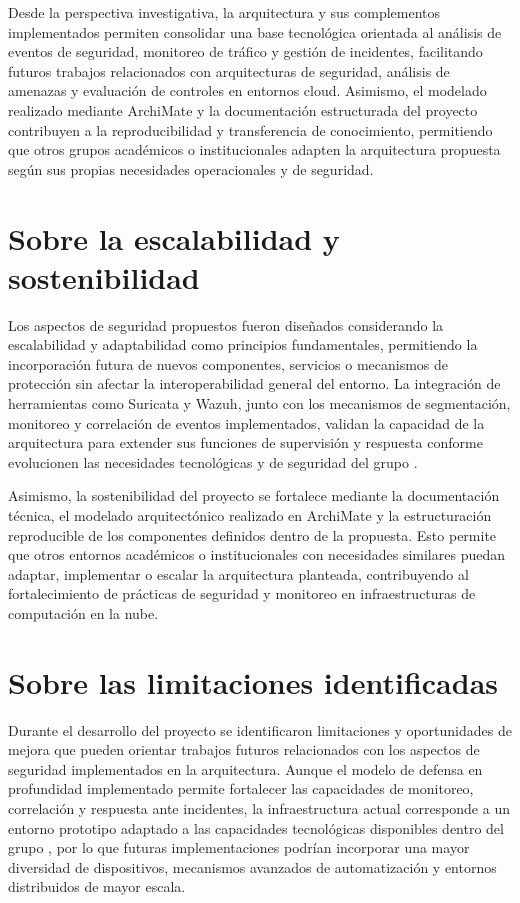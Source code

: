 Desde la perspectiva investigativa, la arquitectura y sus complementos implementados permiten consolidar una base tecnológica orientada al 
análisis de eventos de seguridad, monitoreo de tráfico y gestión de incidentes, facilitando futuros trabajos relacionados con arquitecturas 
de seguridad, análisis de amenazas y evaluación de controles en entornos cloud. Asimismo, el modelado realizado mediante ArchiMate y la 
documentación estructurada del proyecto contribuyen a la reproducibilidad y transferencia de conocimiento, permitiendo que otros grupos 
académicos o institucionales adapten la arquitectura propuesta según sus propias necesidades operacionales y de seguridad.

\section{Sobre la escalabilidad y sostenibilidad}
\noindent

Los aspectos de seguridad propuestos fueron diseñados considerando la escalabilidad y adaptabilidad como principios fundamentales, 
permitiendo la incorporación futura de nuevos componentes, servicios o mecanismos de protección sin afectar la interoperabilidad general 
del entorno. La integración de herramientas como Suricata y Wazuh, junto con los mecanismos de segmentación, monitoreo y correlación de 
eventos implementados, validan la capacidad de la arquitectura para extender sus funciones de supervisión y respuesta conforme evolucionen 
las necesidades tecnológicas y de seguridad del grupo \GRID.

Asimismo, la sostenibilidad del proyecto se fortalece mediante la documentación técnica, el modelado arquitectónico realizado en ArchiMate 
y la estructuración reproducible de los componentes definidos dentro de la propuesta. Esto permite que otros entornos académicos o 
institucionales con necesidades similares puedan adaptar, implementar o escalar la arquitectura planteada, contribuyendo al fortalecimiento 
de prácticas de seguridad y monitoreo en infraestructuras de computación en la nube.

\section{Sobre las limitaciones identificadas}
\noindent

Durante el desarrollo del proyecto se identificaron limitaciones y oportunidades de mejora que pueden orientar trabajos futuros 
relacionados con los aspectos de seguridad implementados en la arquitectura. Aunque el modelo de defensa en profundidad implementado 
permite fortalecer las capacidades de monitoreo, correlación y respuesta ante incidentes, la infraestructura actual corresponde a un 
entorno prototipo adaptado a las capacidades tecnológicas disponibles dentro del grupo \GRID, por lo que futuras implementaciones podrían 
incorporar una mayor diversidad de dispositivos, mecanismos avanzados de automatización y entornos distribuidos de mayor escala.

